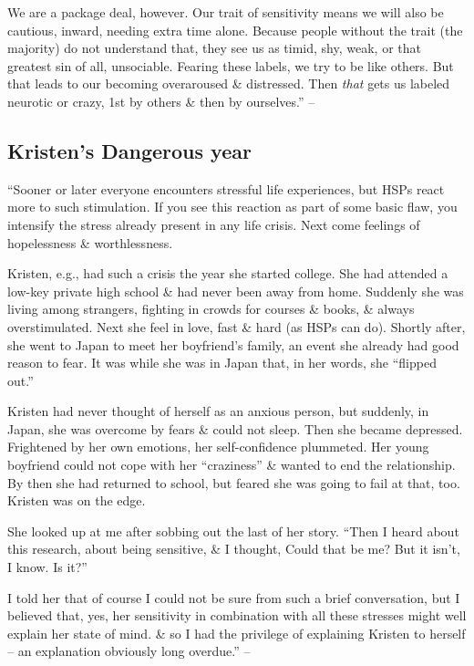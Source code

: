 \documentclass{article}
\numberwithin{equation}{section}
\begin{document}
We are a package deal, however. Our trait of sensitivity means we will also be cautious, inward, needing extra time alone. Because people without the trait (the majority) do not understand that, they see us as timid, shy, weak, or that greatest sin of all, unsociable. Fearing these labels, we try to be like others. But that leads to our becoming overaroused \& distressed. Then \textit{that} gets us labeled neurotic or crazy, 1st by others \& then by ourselves.'' -- \cite[pp. 38--39]{Aron2013}

\subsection{Kristen's Dangerous year}
``Sooner or later everyone encounters stressful life experiences, but HSPs react more to such stimulation. If you see this reaction as part of some basic flaw, you intensify the stress already present in any life crisis. Next come feelings of hopelessness \& worthlessness.

Kristen, e.g., had such a crisis the year she started college. She had attended a low-key private high school \& had never been away from home. Suddenly she was living among strangers, fighting in crowds for courses \& books, \& always overstimulated. Next she feel in love, fast \& hard (as HSPs can do). Shortly after, she went to Japan to meet her boyfriend's family, an event she already had good reason to fear. It was while she was in Japan that, in her words, she ``flipped out.''

Kristen had never thought of herself as an anxious person, but suddenly, in Japan, she was overcome by fears \& could not sleep. Then she became depressed. Frightened by her own emotions, her self-confidence plummeted. Her young boyfriend could not cope with her ``craziness'' \& wanted to end the relationship. By then she had returned to school, but feared she was going to fail at that, too. Kristen was on the edge.

She looked up at me after sobbing out the last of her story. ``Then I heard about this research, about being sensitive, \& I thought, Could that be me? But it isn't, I know. Is it?''

I told her that of course I could not be sure from such a brief conversation, but I believed that, yes, her sensitivity in combination with all these stresses might well explain her state of mind. \& so I had the privilege of explaining Kristen to herself -- an explanation obviously long overdue.'' -- \cite[pp. 39--40]{Aron2013}
\end{document}
